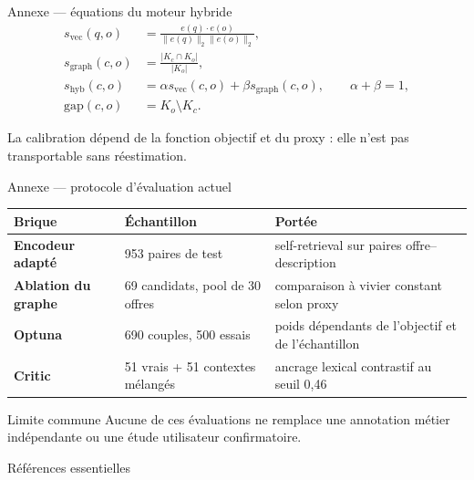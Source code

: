 \documentclass[aspectratio=169,11pt]{beamer}
\begin{document}
\appendix

\begin{frame}{Annexe — équations du moteur hybride}
  \begin{align*}
    s_{\mathrm{vec}}(q,o)
      &= \frac{e(q)\cdot e(o)}{\lVert e(q)\rVert_2\lVert e(o)\rVert_2},\\[0.25cm]
    s_{\mathrm{graph}}(c,o)
      &= \frac{|K_c\cap K_o|}{|K_o|},\\[0.25cm]
    s_{\mathrm{hyb}}(c,o)
      &= \alpha s_{\mathrm{vec}}(c,o)+\beta s_{\mathrm{graph}}(c,o),
      \qquad \alpha+\beta=1,\\[0.25cm]
    \mathrm{gap}(c,o)
      &= K_o\setminus K_c.
  \end{align*}
  \begin{center}
    \small La calibration dépend de la fonction objectif et du proxy : elle n'est
    pas transportable sans réestimation.
  \end{center}
\end{frame}

\begin{frame}{Annexe — protocole d'évaluation actuel}
  \small
  \begin{tabularx}{\textwidth}{>{\bfseries}p{3.2cm}p{3.4cm}X}
    \toprule
    Brique & Échantillon & Portée\\
    \midrule
    Encodeur adapté & 953 paires de test & self-retrieval sur paires offre--description\\
    Ablation du graphe & 69 candidats, pool de 30 offres & comparaison à vivier constant selon proxy\\
    Optuna & 690 couples, 500 essais & poids dépendants de l'objectif et de l'échantillon\\
    Critic & 51 vrais + 51 contextes mélangés & ancrage lexical contrastif au seuil 0,46\\
    \bottomrule
  \end{tabularx}
  \vspace{0.38cm}
  \begin{alertblock}{Limite commune}
    Aucune de ces évaluations ne remplace une annotation métier indépendante ou
    une étude utilisateur confirmatoire.
  \end{alertblock}
\end{frame}

\begin{frame}[allowframebreaks]{Références essentielles}
  \footnotesize
  
  
\end{frame}
\end{document}
